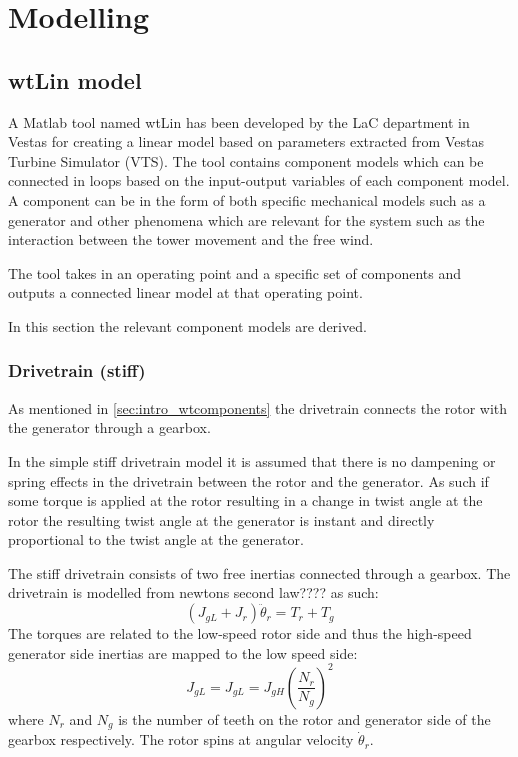 \section{Modelling} \label{sec:mod} %

\subsection{wtLin model}
A Matlab tool named wtLin has been developed by the LaC department in Vestas for creating a linear model based on parameters extracted from Vestas Turbine Simulator (VTS). The tool contains component models which can be connected in loops based on the input-output variables of each component model. A component can be in the form of both specific mechanical models such as a generator and other phenomena which are relevant for the system such as the interaction between the tower movement and the free wind.

The tool takes in an operating point and a specific set of components and outputs a connected linear model at that operating point.

In this section the relevant component models are derived.

\subsubsection{Drivetrain (stiff)}
As mentioned in \cref{sec:intro_wtcomponents} the drivetrain connects the rotor with the generator through a gearbox.

In the simple stiff drivetrain model it is assumed that there is no dampening or spring effects in the drivetrain between the rotor and the generator. As such if some torque is applied at the rotor resulting in a change in twist angle at the rotor the resulting twist angle at the generator is instant and directly proportional to the twist angle at the generator.

The stiff drivetrain consists of two free inertias connected through a gearbox. The drivetrain is modelled from newtons second law???? as such:
\begin{equation}\label{eq:wtlin_comp_drivetrain}
	(J_{gL} + J_{r}) \ddot{\theta}_r = T_{r} + T_{g}
\end{equation}
The torques are related to the low-speed rotor side and thus the high-speed generator side inertias are mapped to the low speed side:
\begin{equation} \label{eq:wtlin_comp_inertiamap}
	J_{gL} = J_{gL} = J_{gH} \left(\dfrac{N_r}{N_g}\right)^2
\end{equation}
where $ N_r $ and $ N_g $ is the number of teeth on the rotor and generator side of the gearbox respectively. The rotor spins at angular velocity $ \dot{\theta}_r $.


